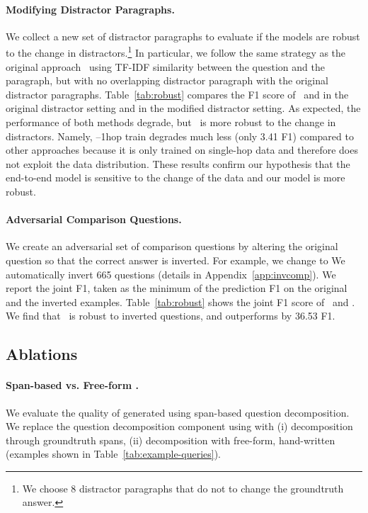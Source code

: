 \paragraph{Modifying Distractor Paragraphs.} We collect a new set of distractor paragraphs to evaluate if the models are robust to the change in distractors.\footnote{We choose 8 distractor paragraphs that do not to change the groundtruth answer.} In particular, we follow the same strategy as the original approach~\citep{hotpot} using TF-IDF similarity between the question and the paragraph, but with no overlapping distractor paragraph with the original distractor paragraphs.
Table~\ref{tab:robust} compares the F1 score of \sys\ and \bert{} in the original distractor setting and in the modified distractor setting.
As expected, the performance of both methods degrade, but \sys\ is more robust to the change in distractors.
Namely, \sys{}--1hop train degrades much less (only 3.41 F1) compared to other approaches because it is only trained on single-hop data and therefore does not exploit the data distribution. 
These results confirm our hypothesis that the end-to-end model is sensitive to the change of the data and our model is more robust.





\paragraph{Adversarial Comparison Questions.}
We create an adversarial set of comparison questions by altering the original question  so that the correct answer is inverted.
For example, we change  to 
We automatically invert 665 questions (details in Appendix~\ref{app:invcomp}). 
We report the joint F1, taken as the minimum of the prediction F1 on the original and the inverted examples.
Table~\ref{tab:robust} shows the joint F1 score of \sys\ and \bert{}.
We find that \sys\ is robust to inverted questions, and outperforms \bert{} by 36.53 F1.


\subsection{Ablations}\label{subsec:ablation}
\paragraph{Span-based vs. Free-form \queries{}.}
We evaluate the quality of generated \queries{} using span-based question decomposition. We replace the question decomposition component using  with (i) \query{} decomposition through groundtruth spans, (ii) \query{} decomposition with free-form, hand-written \queries{} (examples shown in Table~\ref{tab:example-queries}).

